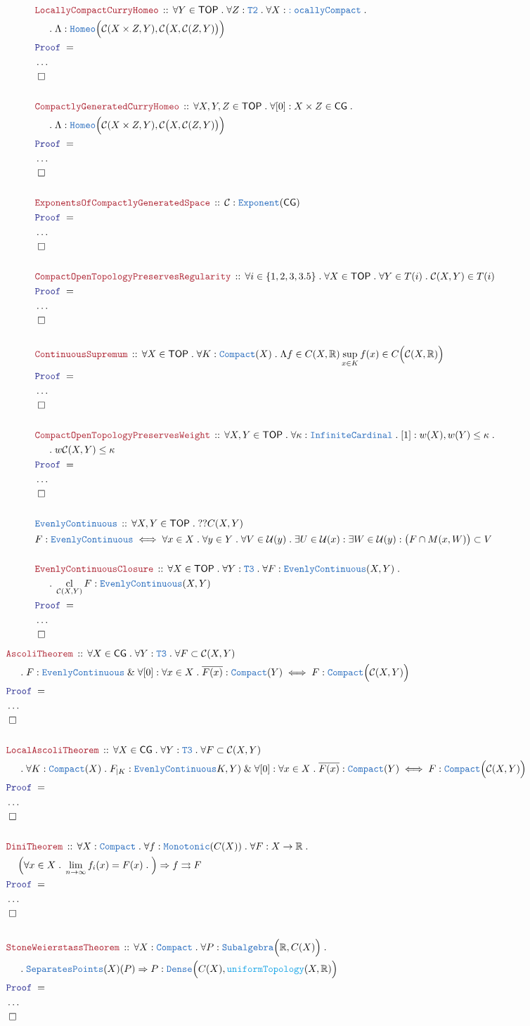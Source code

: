 \documentclass[12pt]{scrartcl}
\newcommand{\TYPE}[1]{\textcolor{NavyBlue}{\mathtt{#1}}}
\newcommand{\FUNC}[1]{\textcolor{Cerulean}{\mathtt{#1}}}
\newcommand{\LOGIC}[1]{\textcolor{Blue}{\mathtt{#1}}}
\newcommand{\THM}[1]{\textcolor{Maroon}{\mathtt{#1}}}
\renewcommand{\.}{\; . \;}
\newcommand{\Theorem}[2]{& \THM{#1} \, :: \, #2 \\ & \Proof = \\ }
\newcommand{\DeclareType}[2]{& \TYPE{#1} \, :: \, #2 \\}
\newcommand{\DefineType}[3]{& #1 : \TYPE{#2} \iff #3 \\}
\newcommand{\NewLine}{\\ & \kern 1pc}
\newcommand{\Page}[1]{ \begin{align*} #1 \end{align*}   }
\newcommand{\NoProof}{ & \ldots \\ \EndProof}
\renewcommand{\And}{\; \& \;}
\newcommand{\Imply}{\Rightarrow}
\newcommand{\Reals}{\mathbb{R} }
\newcommand{\QED}{\; \square}
\newcommand{\EndProof}{& \QED \\}
\newcommand{\Proof}{\LOGIC{Proof} \; }
\newcommand{\C}{\mathcal{C}}
\DeclareMathOperator*{\cl}{cl}
\newcommand{\TOP}{\mathsf{TOP}}
\newcommand{\CG}{\mathsf{CG}}
\newcommand{\U}{\mathcal{U}}
\begin{document}
\Page{
	\Theorem{LocallyCompactCurryHomeo}
	{
		\forall Y \in \TOP \.
		\forall Z : \TYPE{T2} \. 
		\forall X : \TYPE{:ocallyCompact} \.
		\NewLine \. 
		\Lambda : \TYPE{Homeo}\Big( \C(X \times Z, Y), \C\big(X,\C(Z,Y)\big) \Big)
	}
	\NoProof
	\\
	\Theorem{CompactlyGeneratedCurryHomeo}
	{
		\forall X,Y,Z \in \TOP \.
		\forall [0] : X \times Z \in \CG \. 
		\NewLine \. 
		\Lambda : \TYPE{Homeo}\Big( \C(X \times Z, Y), \C\big(X,\C(Z,Y)\big) \Big)
	}
	\NoProof
	\\
	\Theorem{ExponentsOfCompactlyGeneratedSpace}
	{
		\C : \TYPE{Exponent}(\CG)
	}
	\NoProof
	\\
	\Theorem{CompactOpenTopologyPreservesRegularity}
	{
		\forall i \in \{1,2,3,3.5 \} \. 
		\forall X \in \TOP \.
		\forall Y \in T(i) \.
		\C(X,Y) \in T(i)
	}
	\NoProof
	\\
	\Theorem{ContinuousSupremum}
	{
		\forall X \in \TOP \.
		\forall K : \TYPE{Compact}(X) \. 
		\Lambda f \in  C(X,\Reals)  \sup_{x \in K} f(x)  \in C\Big( \C(X,\Reals) \Big)
	}
	\NoProof
	\\
	\Theorem{CompactOpenTopologyPreservesWeight}
	{
		\forall X, Y \in \TOP \. 
		\forall \kappa : \TYPE{InfiniteCardinal} \.
		[1] : w(X),w(Y) \le \kappa \. \NewLine \. 
		w\C(X,Y) \le \kappa
	}
	\NoProof
	\\
	\DeclareType{EvenlyContinuous}
	{
		\forall X,Y \in \TOP \. ??C(X,Y) 
	}
	\DefineType{F}{\TYPE{EvenlyContinuous}}{
		\forall x \in X \. \forall y \in Y \.  \forall V \in \U(y) \.
		\exists U \in \U(x) : \exists W \in \U(y) : 
		\big(F \cap M(x,W)\big) \subset V
	}
	\\
	\Theorem{EvenlyContinuousClosure}
	{
		\forall X \in \TOP \.
		\forall Y : \TYPE{T3} \.
		\forall F : \TYPE{EvenlyContinuous}(X,Y) \. \NewLine \.
		\cl_{\C(X,Y)} F : \TYPE{EvenlyContinuous}(X,Y)
	}
	\NoProof
}
\Page{
	\Theorem{AscoliTheorem}
	{
		\forall X \in \CG \.
		\forall Y  : \TYPE{T3} \.
		\forall F \subset \C(X,Y)   \NewLine \.
		F : \TYPE{EvenlyContinuous}  \And  
		\forall [0] : \forall x \in X \. \overline{F(x)} : \TYPE{Compact}(Y) \iff
		F : \TYPE{Compact}\Big( \C(X,Y)\Big)
	}
	\NoProof
	\\
	\Theorem{LocalAscoliTheorem}
	{
		\forall X \in \CG \.
		\forall Y  : \TYPE{T3} \.
		\forall F \subset \C(X,Y)   \NewLine \.
		\forall K : \TYPE{Compact}(X) \. F_{|K} : \TYPE{EvenlyContinuous}K,Y )  \And  
		\forall [0] : \forall x \in X \. \overline{F(x)} : \TYPE{Compact}(Y) \iff
		F : \TYPE{Compact}\Big( \C(X,Y)\Big)
	}
	\NoProof
	\\
	\Theorem{DiniTheorem}
	{
		\forall X : \TYPE{Compact} \.
		\forall f : \TYPE{Monotonic}( C(X) ) \.
		\forall F : X \to \Reals \. \NewLine
		\Big(
			\forall x \in X \.
			\lim_{n \to \infty} f_i(x) = F(x) \.
		\Big) \Imply
		f \rightrightarrows F
	}
	\NoProof
	\\
	\Theorem{StoneWeierstassTheorem}
	{
		\forall X : \TYPE{Compact} \.
		\forall P : \TYPE{Subalgebra}\Big( \Reals, C(X) \Big) \. \NewLine \.
		\TYPE{SeparatesPoints}(X)(P) \Imply  P : \TYPE{Dense}\Big( C(X), \FUNC{uniformTopology}(X,\Reals) \Big)
	}
	\NoProof
}
\newpage
\end{document}
